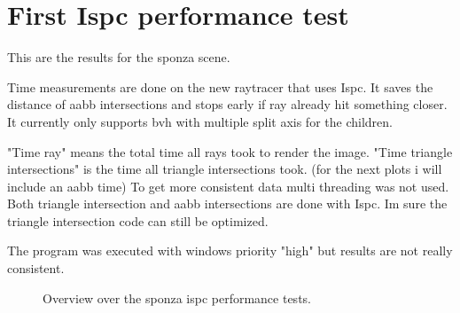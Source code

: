 
\section{First Ispc performance test}

This are the results for the sponza scene. 

Time measurements are done on the new raytracer that uses Ispc. It saves the distance of aabb intersections and stops early if ray already hit something closer. It currently only supports bvh with multiple split axis for the children.

"Time ray" means the total time all rays took to render the image. "Time triangle intersections" is the time all triangle intersections took. (for the next plots i will include an aabb time) To get more consistent data multi threading was not used. Both triangle intersection and aabb intersections are done with Ispc. Im sure the triangle intersection code can still be optimized.

The program was executed with windows priority "high" but results are not really consistent.


\iftrue
\begin{figure}[!htb]
	\begin{minipage}[t]{0.4\textwidth} 
	\end{minipage}\hfil \hfil
	\begin{minipage}[t]{0.4\textwidth}
	\end{minipage}
	
	\caption{Overview over the sponza ispc performance tests.}
\end{figure}
\newpage
\fi


